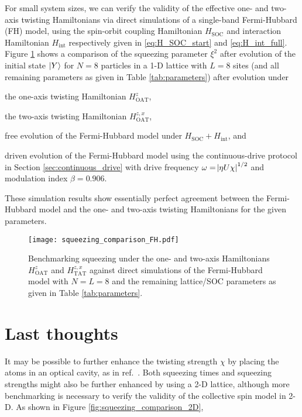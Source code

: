 \documentclass[aps,notitlepage,nofootinbib,11pt]{revtex4-1}
\renewcommand{\t}{\text} %
\newcommand{\1}{\mathds{1}}
\begin{document}
For small system sizes, we can verify the validity of the effective
one- and two-axis twisting Hamiltonians via direct simulations of a
single-band Fermi-Hubbard (FH) model, using the spin-orbit coupling
Hamiltonian $H_{\t{SOC}}$ and interaction Hamiltonian $H_{\t{int}}$
respectively given in \eqref{eq:H_SOC_start} and
\eqref{eq:H_int_full}.  Figure \ref{fig:squeezing_comparison_FH} shows
a comparison of the squeezing parameter $\xi^2$ after evolution of the
initial state $\ket{Y}$ for $N=8$ particles in a 1-D lattice with
$L=8$ sites (and all remaining parameters as given in Table
\ref{tab:parameters}) after evolution under
\begin{enumerate*}[label=(\roman*)]
\item the one-axis twisting Hamiltonian $H_{\t{OAT}}^z$,
\item the two-axis twisting Hamiltonian $H_{\t{OAT}}^{z,x}$,
\item free evolution of the Fermi-Hubbard model under
  $H_{\t{SOC}}+H_{\t{int}}$, and
\item driven evolution of the Fermi-Hubbard model using the
  continuous-drive protocol in Section \ref{sec:continuous_drive} with
  drive frequency $\omega=\abs{\eta U\chi}^{1/2}$ and modulation index
  $\beta=0.906$.
\end{enumerate*}
These simulation results show essentially perfect agreement between
the Fermi-Hubbard model and the one- and two-axis twisting
Hamiltonians for the given parameters.

\begin{figure}
  \centering
  \texttt{[image: squeezing\_comparison\_FH.pdf]}
  \caption{Benchmarking squeezing under the one- and two-axis
    Hamiltonians $H_{\t{OAT}}^z$ and $H_{\t{TAT}}^{z,x}$ against
    direct simulations of the Fermi-Hubbard model with $N=L=8$ and the
    remaining lattice/SOC parameters as given in Table
    \ref{tab:parameters}.}
  \label{fig:squeezing_comparison_FH}
\end{figure}


\section{Last thoughts}

It may be possible to further enhance the twisting strength $\chi$ by
placing the atoms in an optical cavity, as in
ref.~\cite{hu2017vacuum}.  Both squeezing times and squeezing
strengths might also be further enhanced by using a 2-D lattice,
although more benchmarking is necessary to verify the validity of the
collective spin model in 2-D.  As shown in Figure
\ref{fig:squeezing_comparison_2D},
\end{document}
